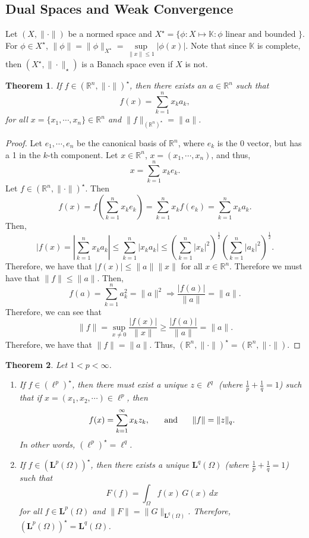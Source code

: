 \documentclass[12pt]{article}
\newtheorem{theorem}{Theorem}
\newcommand{\R}{{\mathbb R}}
\def\K{\mathbb{K}}
\newcommand{\Om}{\Omega}
\newcommand{\suml}{\sum\limits}
\newcommand{\sumk}{\sum\limits_{k = 1}^{\infty}}
\newcommand{\dint}{\displaystyle\int}
\newcommand{\ml}{\mathbf{L}}
\newcommand{\lp}{\left(}
\newcommand{\rp}{\right)}
\newcommand{\Xs}{X^{\star}}
\newcommand{\ns}{(X, \| \cdot \|)}
\begin{document}
\subsection*{Dual Spaces and Weak Convergence}
Let $\ns$ be a normed space and $\Xs = \{ \phi : X \mapsto \K : \phi \text{ linear and bounded } \}$. For $\phi \in \Xs$, $\| \phi \| = \| \phi \|_{\Xs} = \sup\limits_{\| x \| \leq 1} |\phi(x) |$. Note that since $\K$ is complete, then $(\Xs, \| \cdot \|_{\star})$ is a Banach space even if $X$ is not. 
\begin{theorem}
If $f \in \left( \R^n, \| \cdot \| \right)^{\star}$, then there exists an $a \in \R^n$ such that 
\[ f(x) = \suml_{k =1}^n x_k a_k,\]
for all $x = \{ x_1, \cdots, x_n \} \in \R^n$ and $\| f \|_{\lp\R^n\rp^{\star}} = \| a \|$. 
\end{theorem}
\vspace{-25pt}
\begin{proof}
Let $e_1, \cdots, e_n$ be the canonical basis of $\R^n$, where $e_k$ is the 0 vector, but has a 1 in the $k$-th component. Let $x \in \R^n$, $x = (x_1, \cdots, x_n)$, and thus, 
\[ x = \suml_{k = 1}^n x_k e_k. \]
Let $f \in \lp \R^n, \| \cdot \| \rp^{\star}$. Then 
\[ f(x) = f \lp \suml_{k = 1}^n x_k e_k \rp = \suml_{k= 1}^n x_k f(e_k) = \suml_{k= 1}^n x_k a_k. \]
Then, 
\[ |f(x) = \left| \suml_{k= 1}^n x_k a_k \right| \leq \suml_{k= 1}^n \left| x_k a_k \right| \leq \lp \suml_{k= 1}^n |x_k|^2 \rp^{\frac{1}{2}} \lp \suml_{k= 1}^n |a_k|^2 \rp^{\frac{1}{2}}. \]
Therefore, we have that $|f(x)| \leq \| a \| \| x\|$ for all $x \in \R^n$. Therefore we must have that $\| f \| \leq \| a \|$. Then, 
\[f(a) = \suml_{k = 1}^n a_k^2 = \| a \|^2 \Longrightarrow \frac{|f(a)|}{\| a \|} = \| a\|. \]
Therefore, we can see that 
\[ \| f \| = \sup\limits_{x \neq 0} \frac{|f(x)|}{\| x \|} \geq \frac{|f(a)|}{\| a \|} = \| a \|.\]
Therefore, we have that $\| f \| = \| a \|$. Thus, $\lp \R^n, \| \cdot \|\rp^{\star} = \lp \R^n, \| \cdot \|\rp$.
\end{proof}
\begin{theorem}
Let $1 < p < \infty$. 
\begin{enumerate}[topsep=-15pt, itemsep=0pt]
\item If $f \in \lp \ell^p \rp^{\star}$, then there must exist a unique $z \in \ell^q$ (where $\frac{1}{p} + \frac{1}{q} = 1$) such that if $x = (x_1, x_2, \cdots) \in \ell^p$, then 
\[ f(x) = \sumk x_k z_k, \hspace{5mm} \text{ and } \hspace{5mm} \| f\| = \| z \|_q.\]
In other words, $\lp \ell^p \rp^{\star} = \ell^q$. 
\item If $f \in \lp \ml^p(\Om) \rp^{\star}$, then there exists a unique $\ml^q(\Om)$ (where $\frac{1}{p} + \frac{1}{q} = 1$) such that 
\[ F(f) = \dint_{\Om} f(x) \, G(x)\, dx \]
for all $f \in \ml^p(\Om)$ and $\| F \| = \| G \|_{\ml^q(\Om)}$. Therefore, $\lp \ml^p(\Om) \rp^{\star} = \ml^q(\Om)$. 
\end{enumerate}
\end{theorem}
\end{document}
